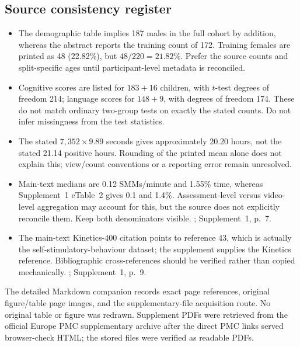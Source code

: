 \subsection{Source consistency register}
\begin{itemize}[leftmargin=*]
\item The demographic table implies 187 males in the full cohort by addition, whereas the abstract reports the training count of 172. Training females are printed as 48 (22.82\%), but $48/220=21.82\%$. Prefer the source counts and split-specific ages until participant-level metadata is reconciled. \cite[pp.~1,4]{barami2024}
\item Cognitive scores are listed for $183+16$ children, with $t$-test degrees of freedom 214; language scores for $148+9$, with degrees of freedom 174. These do not match ordinary two-group tests on exactly the stated counts. Do not infer missingness from the test statistics. \cite[p.~4]{barami2024}
\item The stated $7{,}352\times9.89$ seconds gives approximately 20.20 hours, not the stated 21.14 positive hours. Rounding of the printed mean alone does not explain this; view/count conventions or a reporting error remain unresolved. \cite[p.~3]{barami2024}
\item Main-text medians are 0.12 SMMs/minute and 1.55\% time, whereas Supplement~1 eTable~2 gives 0.1 and 1.4\%. Assessment-level versus video-level aggregation may account for this, but the source does not explicitly reconcile them. Keep both denominators visible. \cite[p.~5]{barami2024}; Supplement~1, p.~7.
\item The main-text Kinetics-400 citation points to reference 43, which is actually the self-stimulatory-behaviour dataset; the supplement supplies the Kinetics reference. Bibliographic cross-references should be verified rather than copied mechanically. \cite[pp.~4,12]{barami2024}; Supplement~1, p.~9.
\end{itemize}

The detailed Markdown companion records exact page references, original figure/table page images, and the supplementary-file acquisition route. No original table or figure was redrawn. Supplement PDFs were retrieved from the official Europe PMC supplementary archive after the direct PMC links served browser-check HTML; the stored files were verified as readable PDFs.
